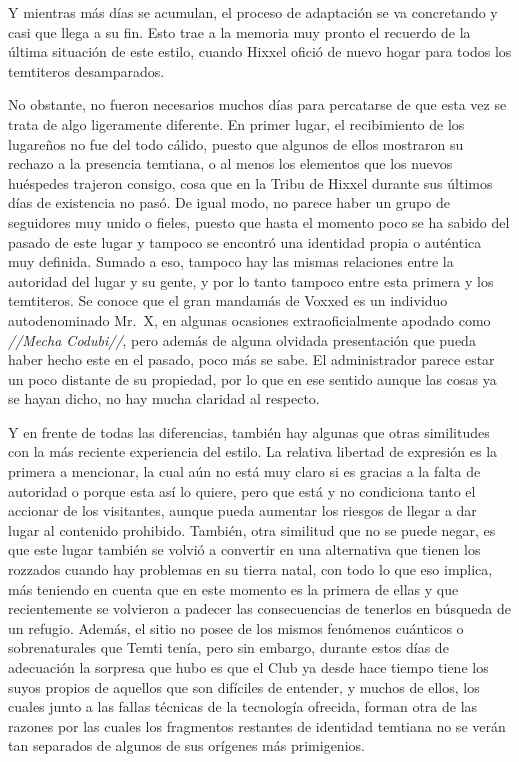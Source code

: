 \documentclass[
  spanish,
]{book}
\begin{document}
Y mientras más días se acumulan, el proceso de adaptación se va concretando y casi que llega a su fin. Esto trae a la memoria muy pronto el recuerdo de la última situación de este estilo, cuando Hixxel ofició de nuevo hogar para todos los temtiteros desamparados.

No obstante, no fueron necesarios muchos días para percatarse de que esta vez se trata de algo ligeramente diferente. En primer lugar, el recibimiento de los lugareños no fue del todo cálido, puesto que algunos de ellos mostraron su rechazo a la presencia temtiana, o al menos los elementos que los nuevos huéspedes trajeron consigo, cosa que en la Tribu de Hixxel durante sus últimos días de existencia no pasó. De igual modo, no parece haber un grupo de seguidores muy unido o fieles, puesto que hasta el momento poco se ha sabido del pasado de este lugar y tampoco se encontró una identidad propia o auténtica muy definida. Sumado a eso, tampoco hay las mismas relaciones entre la autoridad del lugar y su gente, y por lo tanto tampoco entre esta primera y los temtiteros. Se conoce que el gran mandamás de Voxxed es un individuo autodenominado Mr.~X, en algunas ocasiones extraoficialmente apodado como \emph{//Mecha Codubi//}, pero además de alguna olvidada presentación que pueda haber hecho este en el pasado, poco más se sabe. El administrador parece estar un poco distante de su propiedad, por lo que en ese sentido aunque las cosas ya se hayan dicho, no hay mucha claridad al respecto.

Y en frente de todas las diferencias, también hay algunas que otras similitudes con la más reciente experiencia del estilo. La relativa libertad de expresión es la primera a mencionar, la cual aún no está muy claro si es gracias a la falta de autoridad o porque esta así lo quiere, pero que está y no condiciona tanto el accionar de los visitantes, aunque pueda aumentar los riesgos de llegar a dar lugar al contenido prohibido. También, otra similitud que no se puede negar, es que este lugar también se volvió a convertir en una alternativa que tienen los rozzados cuando hay problemas en su tierra natal, con todo lo que eso implica, más teniendo en cuenta que en este momento es la primera de ellas y que recientemente se volvieron a padecer las consecuencias de tenerlos en búsqueda de un refugio. Además, el sitio no posee de los mismos fenómenos cuánticos o sobrenaturales que Temti tenía, pero sin embargo, durante estos días de adecuación la sorpresa que hubo es que el Club ya desde hace tiempo tiene los suyos propios de aquellos que son difíciles de entender, y muchos de ellos, los cuales junto a las fallas técnicas de la tecnología ofrecida, forman otra de las razones por las cuales los fragmentos restantes de identidad temtiana no se verán tan separados de algunos de sus orígenes más primigenios.
\end{document}
